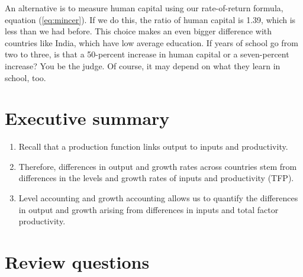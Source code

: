 An alternative is to measure human capital using our
rate-of-return formula, equation (\ref{eq:mincer}).
If we do this, the ratio of human capital is 1.39,
which is less than we had before.
This choice makes an even bigger difference with countries
like India, which have low average education.
If years of school go from two to three, is that a 50-percent increase
in human capital or a seven-percent increase?
You be the judge.
Of course, it may depend on what they learn in school, too.


\section*{Executive summary}

\setlength{\leftmargini}{.5\oldleftmargini}
\begin{enumerate}
\item Recall that a production function links output to inputs and productivity.

\item Therefore, differences in output and growth rates across countries
stem from differences in the levels and growth rates
of inputs and productivity (TFP).

\item Level accounting and growth accounting
 allows us to quantify the differences in output and growth arising from differences in inputs and total factor productivity.
\end{enumerate}
\setlength{\leftmargini}{\oldleftmargini}

\section*{Review questions}

